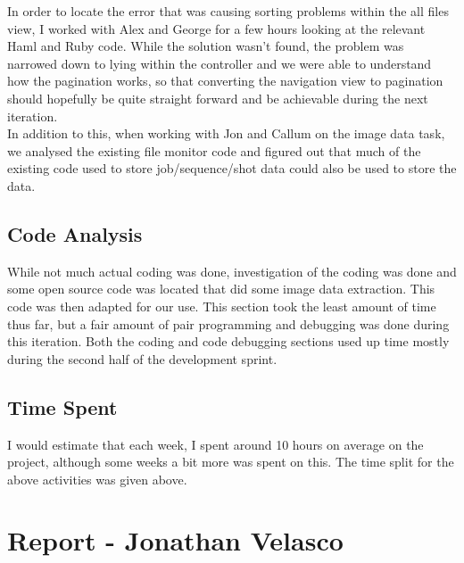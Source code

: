 \documentclass{article}
\begin{document}
In order to locate the error that was causing sorting problems within the all files view, I worked with Alex and George for a few hours looking at the relevant Haml and Ruby code. While the solution wasn’t found, the problem was narrowed down to lying within the controller and we were able to understand how the pagination works, so that converting the navigation view to pagination should hopefully be quite straight forward and be achievable during the next iteration.\\
In addition to this, when working with Jon and Callum on the image data task, we analysed the existing file monitor code and figured out that much of the existing code used to store job/sequence/shot data could also be used to store the data.\\

\subsection{Code Analysis}

While not much actual coding was done, investigation of the coding was done and some open source code was located that did some image data extraction. This code was then adapted for our use. This section took the least amount of time thus far, but a fair amount of pair programming and debugging was done during this iteration. Both the coding and code debugging sections used up time mostly during the second half of the development sprint.\\

\subsection{Time Spent}

I would estimate that each week, I spent around 10 hours on average on the project, although some weeks a bit more was spent on this. The time split for the above activities was given above.\\

\newpage{}

\section{Report - Jonathan Velasco}

\end{document}
